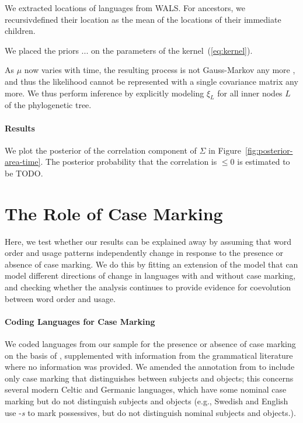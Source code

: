 \documentclass[11pt,a4paper]{article}
\begin{document}
We extracted locations of languages from WALS.
For ancestors, we recursivdefined their location as the mean of the locations of their immediate children.

We placed the priors ... on the parameters of the kernel~(\ref{eq:kernel}).

As $\mu$ now varies with time, the resulting process is not Gauss-Markov any more \citep{schach1971weak}, and thus the likelihood cannot be represented with a single covariance matrix any more.
We thus perform inference by explicitly modeling $\xi_L$ for all inner nodes $L$ of the phylogenetic tree.



\paragraph{Results}
We plot the posterior of the correlation component of $\Sigma$ in Figure~\ref{fig:posterior-area-time}.
The posterior probability that the correlation is $\leq 0$ is estimated to be TODO.







\section{The Role of Case Marking}

Here, we test whether our results can be explained away by assuming that word order and usage patterns independently change in response to the presence or absence of case marking.
We do this by fitting an extension of the model that can model different directions of change in languages with and without case marking, and checking whether the analysis continues to provide evidence for coevolution between word order and usage.

\paragraph{Coding Languages for Case Marking}
We coded languages from our sample for the presence or absence of case marking on the basis of \citep{iggesen2013number}, supplemented with information from the grammatical literature where no information was provided.
We amended the annotation from \citep{iggesen2013number} to include only case marking that distinguishes between subjects and objects; this concerns several modern Celtic and Germanic languages, which have some nominal case marking but do not distinguish subjects and objects (e.g., Swedish and English use -\textit{s} to mark possessives, but do not distinguish nominal subjects and objects.).
\end{document}
